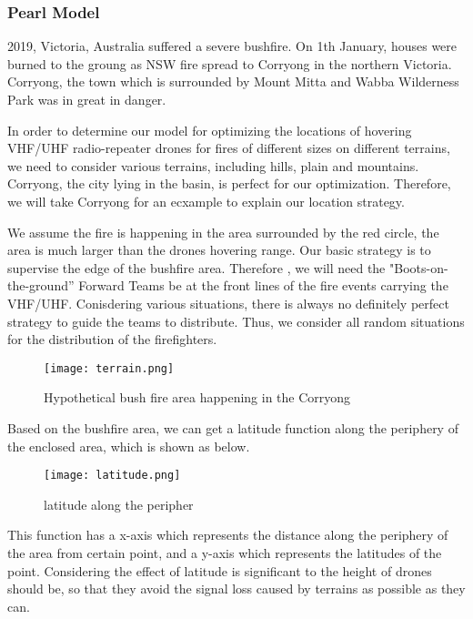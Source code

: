 \documentclass[../main]{subfiles}
\begin{document}
\subsubsection{Pearl Model}

2019, Victoria, Australia suffered a severe bushfire. On 1th January,
houses were burned to the groung as NSW fire spread to Corryong in the
northern Victoria. Corryong, the town which is surrounded by Mount Mitta
and Wabba Wilderness Park was in great in danger.

In order to determine our model for optimizing the locations of hovering
VHF/UHF radio-repeater drones for fires of different sizes on different
terrains, we need to consider various terrains, including hills, plain
and mountains. Corryong, the city lying in the basin, is perfect for our
optimization. Therefore, we will take Corryong for an ecxample to
explain our location strategy.

We assume the fire is happening in the area surrounded by the red
circle, the area is much larger than the drones hovering range. Our
basic strategy is to supervise the edge of the bushfire area. Therefore
, we will need the "Boots-on-the-ground'' Forward Teams be at the front
lines of the fire events carrying the VHF/UHF. Conisdering various
situations, there is always no definitely perfect strategy to guide the
teams to distribute. Thus, we consider all random situations for the
distribution of the firefighters.

\begin{figure}[h!]
      \centering
      \texttt{[image: terrain.png]}
      \caption{Hypothetical bush fire area happening in the Corryong}
    \end{figure}

Based on the bushfire area, we can get a latitude function along the
periphery of the enclosed area, which is shown as below.
\begin{figure}[h!]
      \centering
      \captionsetup{justification=centering}
      \texttt{[image: latitude.png]}
      \caption{latitude along the peripher}
      \end{figure}
    
This function has a x-axis which represents the distance along the
periphery of the area from certain point, and a y-axis which represents
the latitudes of the point. Considering the effect of latitude is
significant to the height of drones should be, so that they avoid the
signal loss caused by terrains as possible as they can.
\end{document}

